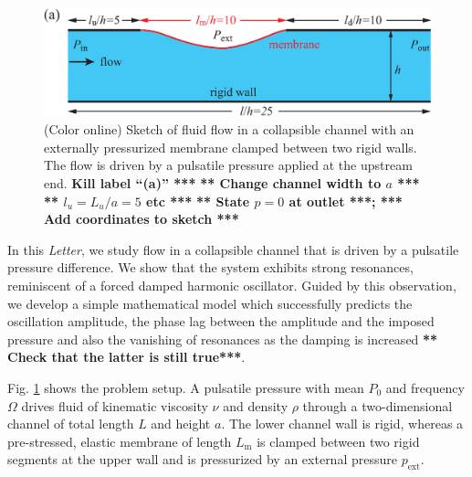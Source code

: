 \documentclass[aps,prl,reprint,superscriptaddress,floatfix]{revtex4-1}
\begin{document}

\begin{figure}
	\includegraphics[width=1\linewidth, trim={0cm 0cm -0.35cm 0cm}, clip]{./epsFig/fig1a.eps}
	\caption{\label{fig:setup}(Color online) Sketch of fluid
          flow in a collapsible channel with an externally pressurized
          membrane clamped between two rigid walls. The flow is driven
          by a pulsatile pressure applied at the upstream end.
          {\bf Kill label ``(a)'' ***}
          {\bf *** Change channel width to $a$ ***}
                    {\bf *** $l_{u} = L_{u}/a = 5$ etc ***}
          {\bf *** State $p=0$ at outlet ***; *** Add
           coordinates to sketch ***}}
\end{figure}

In this \emph{Letter}, we study flow in a 
collapsible channel that is driven by a pulsatile
pressure difference. We show that the
system exhibits strong resonances, reminiscent of a
forced damped harmonic oscillator. Guided by this observation, we develop
a simple mathematical model which successfully predicts the
oscillation amplitude, the phase lag between the
amplitude and the imposed pressure and also the vanishing of resonances
as the damping is increased {\bf *** Check that the latter is still true***}.

Fig. \ref{fig:setup} shows the problem setup.
A pulsatile pressure with mean $P_0$ and frequency $\Omega$
drives fluid of kinematic viscosity $\nu$ and density $\rho$
through a two-dimensional channel of total length $L$ and height $a$.
The lower channel wall is rigid, whereas a pre-stressed, elastic
membrane of length $L_\text{m}$ is clamped
between two rigid segments at the upper wall and is pressurized by an external
pressure $p_\text{ext}$.
\end{document}

